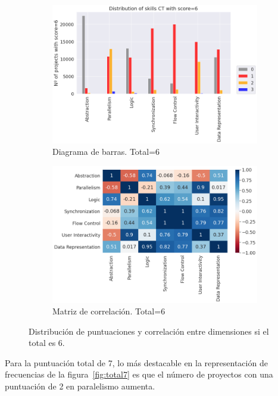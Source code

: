 \documentclass[a4paper, 12pt]{book}
\begin{document}
\begin{figure}[H]
    \centering
    \begin{subfigure}[h]{.49\textwidth} 
        \includegraphics[width=\textwidth]{img/distribucion_6_Scratch}
        \caption{Diagrama de barras. Total=6}
        \label{fig:total6}
    \end{subfigure}       
    \begin{subfigure}[h]{.49\textwidth} 
        \includegraphics[width=\textwidth]{img/corr_6_Scratch}
        \caption{Matriz de correlación. Total=6}
        \label{fig:corr6}
    \end{subfigure}
     \caption{Distribución de puntuaciones y correlación entre dimensiones si el total es 6.}
\end{figure}

Para la puntuación total de 7, lo más destacable en la representación de frecuencias de la figura~\ref{fig:total7} es que el número de proyectos con una puntuación de 2 en paralelismo aumenta.
\end{document}
